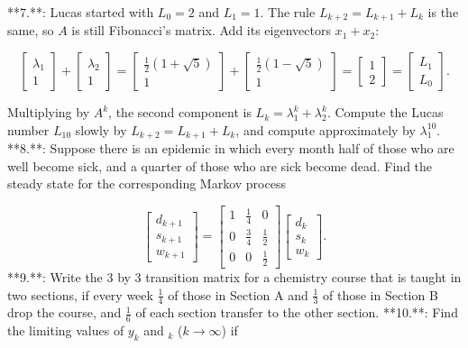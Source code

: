 

**7.**: Lucas started with \(L_{0}=2\) and \(L_{1}=1\). The rule \(L_{k+2}=L_{k+1}+L_{k}\) is the same, so \(A\) is still Fibonacci's matrix. Add its eigenvectors \(x_{1}+x_{2}\):

\[\begin{bmatrix}\lambda_{1}\\ 1\end{bmatrix}+\begin{bmatrix}\lambda_{2}\\ 1\end{bmatrix}=\begin{bmatrix}\frac{1}{2}(1+\sqrt{5})\\ 1\end{bmatrix}+\begin{bmatrix}\frac{1}{2}(1-\sqrt{5})\\ 1\end{bmatrix}=\begin{bmatrix}1\\ 2\end{bmatrix}=\begin{bmatrix}L_{1}\\ L_{0}\end{bmatrix}.\]

Multiplying by \(A^{k}\), the second component is \(L_{k}=\lambda_{1}^{k}+\lambda_{2}^{k}\). Compute the Lucas number \(L_{10}\) slowly by \(L_{k+2}=L_{k+1}+L_{k}\), and compute approximately by \(\lambda_{1}^{10}\).
**8.**: Suppose there is an epidemic in which every month half of those who are well become sick, and a quarter of those who are sick become dead. Find the steady state for the corresponding Markov process

\[\begin{bmatrix}d_{k+1}\\ s_{k+1}\\ w_{k+1}\end{bmatrix}=\begin{bmatrix}1&\frac{1}{4}&0\\ 0&\frac{3}{4}&\frac{1}{2}\\ 0&0&\frac{1}{2}\end{bmatrix}\begin{bmatrix}d_{k}\\ s_{k}\\ w_{k}\end{bmatrix}.\]
**9.**: Write the 3 by 3 transition matrix for a chemistry course that is taught in two sections, if every week \(\frac{1}{4}\) of those in Section A and \(\frac{1}{3}\) of those in Section B drop the course, and \(\frac{1}{6}\) of each section transfer to the other section.
**10.**: Find the limiting values of \(y_{k}\) and \({}_{k}\) (\(k\to\infty\)) if

